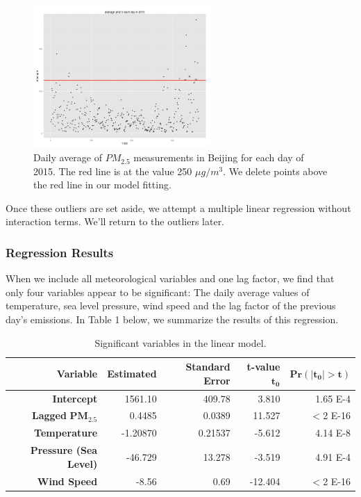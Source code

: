 \documentclass[11pt]{article} %
\begin{document}
 \begin{figure}[!ht]
  \centering
    \includegraphics[width=0.6\textwidth]{Figure2-1}
      \caption{Daily average of \(PM_{2.5}\) measurements in Beijing for each day of 2015. The red line is at the value 250 \(\mu g / m^3\). We delete points above the red line in our model fitting.}
\end{figure}
 
 
Once these outliers are set aside, we attempt a multiple linear regression without interaction terms. We'll return to the outliers later. 

\subsubsection{Regression Results} 
When we include all meteorological variables and one lag factor, we find that only four variables appear to be significant: The daily average values of temperature, sea level pressure, wind speed and the lag factor of the previous day's emissions. In Table 1 below, we summarize the results of this regression.
 
 \begin{table}
 \begin{tabular} {| r | r | r | r | r |}
 \hline
 \textbf{Variable} & 
\textbf{Estimated} & 
\textbf{Standard Error} & 
\textbf{t-value} \(\mathbf{t_0}\) & 
\(\mathbf{Pr(\vert t_0 \vert >t)}\) \\ \hline
\textbf{Intercept} & 1561.10 & 409.78 & 3.810 & 1.65 E-4 \\ \hline
\textbf{Lagged }\(\mathbf{PM_{2.5}}\) & 0.4485 & 0.0389 & 11.527 & \(<\)2 E-16 \\ \hline
\textbf{Temperature} & -1.20870 & 0.21537 & -5.612 & 4.14 E-8 \\ \hline
\textbf{Pressure (Sea Level)} & -46.729 & 13.278 & -3.519 & 4.91 E-4 \\ \hline
\textbf{Wind Speed} & -8.56 & 0.69 & -12.404 & \(<\)2 E-16 \\ \hline
 \end{tabular}
 \caption{Significant variables in the linear model.}
 \end{table}
 
\end{document}
